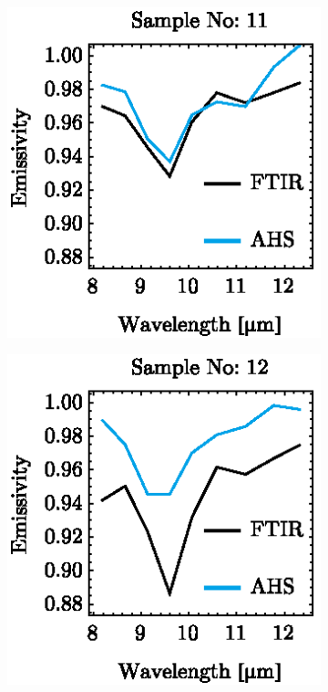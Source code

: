 \begin{figure}[!t]
	\centering
	\vspace{1em}
	\begin{subfigure}[t]{.3\linewidth}
		\centering
		\includegraphics[scale=1]{pics/Chapter_05/Sample_no_11.eps}
		\caption{}
	\end{subfigure}
	\hspace{1em}
	\begin{subfigure}[t]{.3\linewidth}
		\centering
		\includegraphics[scale=1]{pics/Chapter_05/Sample_no_12.eps}
		\caption{}
	\end{subfigure}
	\hspace{1em}
	\begin{subfigure}[t]{.3\linewidth}
		\centering

\end{subfigure}
\end{figure}
